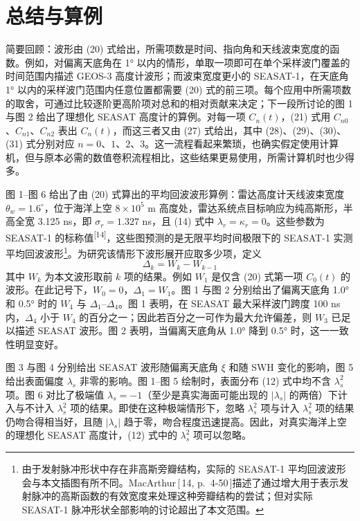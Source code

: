 \section{总结与算例}
\seccontent
简要回顾：波形由 (20) 式给出，所需项数是时间、指向角和天线波束宽度的函数。例如，对偏离天底角在 1° 以内的情形，单取一项即可在单个采样波门覆盖的时间范围内描述 GEOS-3 高度计波形；而波束宽度更小的 SEASAT-1，在天底角 1° 以内的采样波门范围内任意位置都需要 (20) 式的前三项。每个应用中所需项数的取舍，可通过比较逐阶更高阶项对总和的相对贡献来决定；下一段所讨论的图 1 与图 2 给出了理想化 SEASAT 高度计的算例。对每一项 $C_{n}(t)$，(21) 式用 $C_{n0}$、$C_{n1}$、$C_{n2}$ 表出 $C_{n}(t)$，而这三者又由 (27) 式给出，其中 (28)、(29)、(30)、(31) 式分别对应 $n = 0$、$1$、$2$、$3$。这一流程看起来繁琐，也确实假定使用计算机，但与原本必需的数值卷积流程相比，这些结果更易使用，所需计算机时也少得多。

图 1--图 6 给出了由 (20) 式算出的平均回波波形算例：雷达高度计天线波束宽度 $\theta_{w} = 1.6^{\circ}$，位于海洋上空 $8\times10^{5}$ m 高度处，雷达系统点目标响应为纯高斯形，半高全宽 3.125 ns，即 $\sigma_{r} = 1.327$ ns，且 (14) 式中 $\lambda_{r} = \kappa_{r} = 0$。这些参数为 SEASAT-1 的标称值\textsuperscript{[14]}，这些图预测的是无限平均时间极限下的 SEASAT-1 实测平均回波波形\footnote{由于发射脉冲形状中存在非高斯旁瓣结构，实际的 SEASAT-1 平均回波波形会与本文插图有所不同。MacArthur\,[\,14, p.~4-50\,]描述了通过增大用于表示发射脉冲的高斯函数的有效宽度来处理这种旁瓣结构的尝试；但对实际 SEASAT-1 脉冲形状全部影响的讨论超出了本文范围。}。为研究该情形下波形展开应取多少项，定义
\[
\Delta_{k} = W_{k} - W_{k-1}
\tag{32}
\]
其中 $W_{k}$ 为本文波形取前 $k$ 项的结果。例如 $W_{1}$ 是仅含 (20) 式第一项 $C_{0}(t)$ 的波形。在此记号下，$W_{0} = 0$，$\Delta_{1} = W_{1}$。图 1 与图 2 分别给出了偏离天底角 1.0° 和 0.5° 时的 $W_{4}$ 与 $\Delta_{1}$--$\Delta_{4}$。图 1 表明，在 SEASAT 最大采样波门跨度 100 ns 内，$\Delta_{4}$ 小于 $W_{4}$ 的百分之一；因此若百分之一可作为最大允许偏差，则 $W_{3}$ 已足以描述 SEASAT 波形。图 2 表明，当偏离天底角从 1.0° 降到 0.5° 时，这一一致性明显变好。



图 3 与图 4 分别给出 SEASAT 波形随偏离天底角 $\xi$ 和随 SWH 变化的影响，图 5 给出表面偏度 $\lambda_{s}$ 非零的影响。图 1--图 5 绘制时，表面分布 (12) 式中均不含 $\lambda_{s}^{2}$ 项。图 6 对比了极端值 $\lambda_{s} = -1$（至少是真实海面可能出现的 $|\lambda_{s}|$ 的两倍）下计入与不计入 $\lambda_{s}^{2}$ 项的结果。即使在这种极端情形下，忽略 $\lambda_{s}^{2}$ 项与计入 $\lambda_{s}^{2}$ 项的结果仍吻合得相当好，且随 $|\lambda_{s}|$ 趋于零，吻合程度迅速提高。因此，对真实海洋上空的理想化 SEASAT 高度计，(12) 式中的 $\lambda_{s}^{2}$ 项可以忽略。

